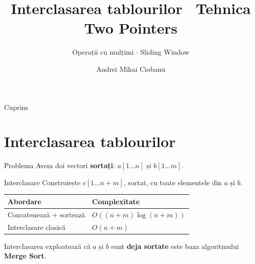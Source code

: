 \documentclass{beamer}
\title{Interclasarea tablourilor \textbar\ Tehnica Two Pointers}
\subtitle{Operații cu mulțimi $\cdot$ Sliding Window}
\author{Andrei Mihai Ciobanu}
\institute{Algolymp Summer School}
\date{}
\begin{document}
\begin{frame}[shrink]
  \titlepage
\end{frame}

\begin{frame}{Cuprins}
  \tableofcontents
\end{frame}

\section{Interclasarea tablourilor}

\begin{frame}{Problema}
  Avem doi vectori \textbf{sortați}: $a[1 \ldots n]$ și $b[1 \ldots m]$.

  \begin{block}{Interclasare}
    Construiește $c[1 \ldots n{+}m]$, sortat, cu toate elementele din $a$ și $b$.
  \end{block}

  \smallskip
  \begin{center}
  \begin{tabular}{ll}
    \toprule
    Abordare & Complexitate \\
    \midrule
    Concatenează $+$ sortează & $O((n+m)\log(n+m))$ \\
    Interclasare clasică & $O(n+m)$ \\
    \bottomrule
  \end{tabular}
  \end{center}

  \smallskip
  Interclasarea exploatează că $a$ și $b$ sunt \textbf{deja sortate} \textemdash{}
  este baza algoritmului \textbf{Merge Sort}.
\end{frame}
\end{document}
